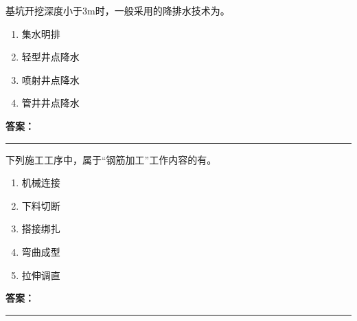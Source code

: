\documentclass[UTF8,fontset=fandol,11pt]{ctexart}
\newcommand{\answerline}{\textcolor{answerred}{\rule{2.4cm}{0.7pt}}}
\begin{document}
\begin{quizbox}[title={乱序第 225 题｜第三章基坑工程}]

基坑开挖深度小于3m时，一般采用的降排水技术为。\\

\begin{enumerate}[label=\Alph*.]

\item 集水明排

\item 轻型井点降水

\item 喷射井点降水

\item 管井井点降水

\end{enumerate}

\textbf{\textcolor{answerred}{答案：}} \answerline

\end{quizbox}

\vspace{0.2em}

\begin{quizbox}[title={乱序第 226 题｜第四章混凝土结构工程}]

下列施工工序中，属于“钢筋加工”工作内容的有。\\

\begin{enumerate}[label=\Alph*.]

\item 机械连接

\item 下料切断

\item 搭接绑扎

\item 弯曲成型

\item 拉伸调直

\end{enumerate}

\textbf{\textcolor{answerred}{答案：}} \answerline

\end{quizbox}

\vspace{0.2em}
\end{document}
